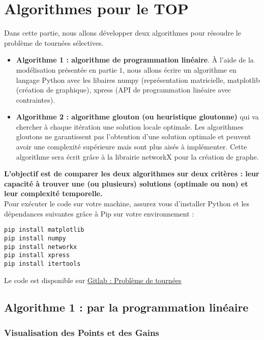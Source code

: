 \documentclass[a4paper, 12pt, DIV=12]{scrartcl}
\begin{document}
\section{Algorithmes pour le TOP}
Dans cette partie, nous allons développer deux algorithmes pour résoudre le problème de tournées sélectives. \\[5pt]
\begin{itemize}
    \item \textbf{Algorithme 1 : algorithme de programmation linéaire}. À l'aide de la modélisation présentée en partie $1$, nous allons écrire un algorithme en langage Python avec les libaires numpy (représentation matricielle, matplotlib (création de graphique), xpress (API de programmation linéaire avec contraintes). \\[5pt]
    \item \textbf{Algorithme 2 : algorithme glouton (ou heuristique gloutonne)} qui va chercher à chaque itération une solution locale optimale. Les algorithmes gloutons ne garantissent pas l'obtention d'une solution optimale et peuvent avoir une complexité supérieure mais sont plus aisés à implémenter. Cette algorithme sera écrit grâce à la librairie networkX pour la création de graphe. 
\\[10pt]    
\end{itemize}
\textbf{L'objectif est de comparer les deux algorithmes sur deux critères : leur capacité à trouver une (ou plusieurs) solutions (optimale ou non) et leur complexité temporelle.}\\[3pt]
Pour exécuter le code sur votre machine, assurez vous d'installer Python et les dépendances suivantes grâce à Pip sur votre environnement : 
\begin{verbatim}
pip install matplotlib 
pip install numpy
pip install networkx
pip install xpress
pip install itertools
\end{verbatim}
Le code est disponible sur \href{https://gitlab.utc.fr/qvalakou/ai09_tournees}{Gitlab : Problème de tournées}

\newpage
\subsection{Algorithme 1 : par la programmation linéaire}
\subsubsection{Visualisation des Points et des Gains}
\end{document}
